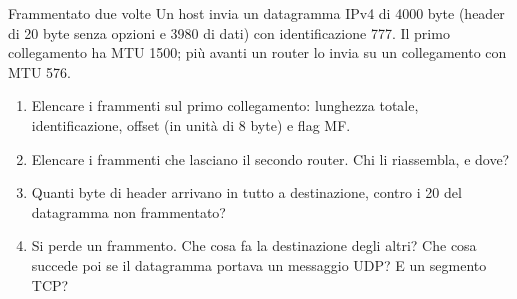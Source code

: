 \begin{esercizio}{Frammentato due volte}
Un host invia un datagramma IPv4 di 4000 byte (header di 20 byte senza opzioni e 3980 di dati) con identificazione 777. Il primo
collegamento ha MTU 1500; più avanti un router lo invia su un collegamento con MTU 576.
\begin{enumerate}[label=(\alph*)]
    \item Elencare i frammenti sul primo collegamento: lunghezza totale, identificazione, offset (in unità di 8 byte) e flag MF.
    \item Elencare i frammenti che lasciano il secondo router. Chi li riassembla, e dove?
    \item Quanti byte di header arrivano in tutto a destinazione, contro i 20 del datagramma non frammentato?
    \item Si perde un frammento. Che cosa fa la destinazione degli altri? Che cosa succede poi se il datagramma portava un messaggio UDP? E un
          segmento TCP?
\end{enumerate}


\end{esercizio}
